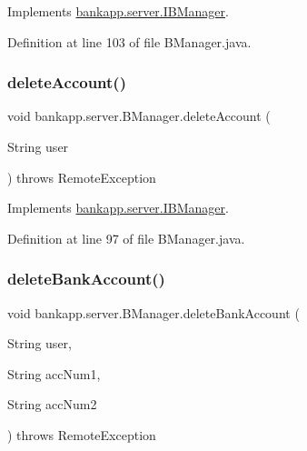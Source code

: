 Implements \hyperlink{interfacebankapp_1_1server_1_1_i_b_manager_a09b3ca29b50f7c662e360a47cea220ae}{bankapp.\+server.\+I\+B\+Manager}.



Definition at line 103 of file B\+Manager.\+java.

\mbox{\label{classbankapp_1_1server_1_1_b_manager_ad8c5c164841d3ad7e25070c6b065bb4d}} 
\subsubsection{\texorpdfstring{delete\+Account()}{deleteAccount()}}
{\footnotesize\ttfamily void bankapp.\+server.\+B\+Manager.\+delete\+Account (\begin{DoxyParamCaption}\item[{String}]{user }\end{DoxyParamCaption}) throws Remote\+Exception}



Implements \hyperlink{interfacebankapp_1_1server_1_1_i_b_manager_aa1f1aee23930d78375c12496e9f47cdf}{bankapp.\+server.\+I\+B\+Manager}.



Definition at line 97 of file B\+Manager.\+java.

\mbox{\label{classbankapp_1_1server_1_1_b_manager_a56404dc8a349618d517f73ad4f8e0026}} 
\subsubsection{\texorpdfstring{delete\+Bank\+Account()}{deleteBankAccount()}}
{\footnotesize\ttfamily void bankapp.\+server.\+B\+Manager.\+delete\+Bank\+Account (\begin{DoxyParamCaption}\item[{String}]{user,  }\item[{String}]{acc\+Num1,  }\item[{String}]{acc\+Num2 }\end{DoxyParamCaption}) throws Remote\+Exception}




